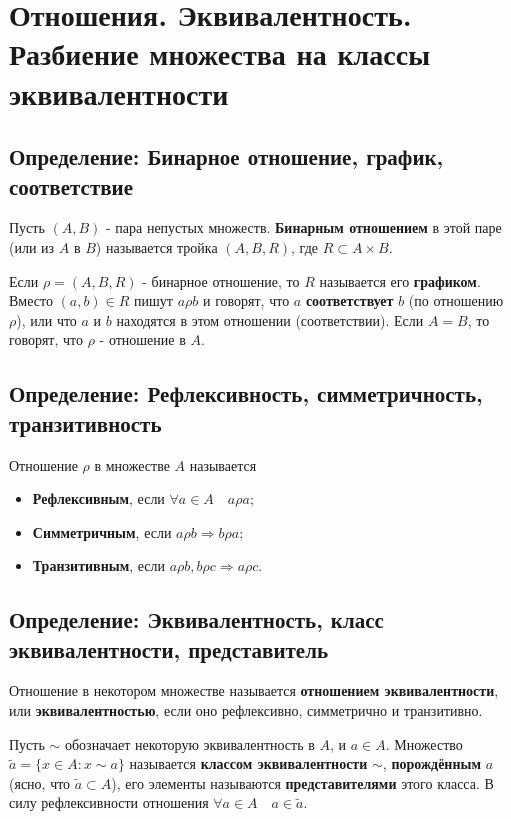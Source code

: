 \documentclass{article}
\begin{document}
\newpage
\section{Отношения. Эквивалентность. Разбиение множества на классы эквивалентности}

\subsection{Определение: Бинарное отношение, график, соответствие}
Пусть $(A, B)$ - пара непустых множеств. \textbf{Бинарным отношением} в этой паре (или из $A$ в $B$) называется тройка $(A, B, R)$, где $R \subset A \times B$.

Если $\rho = (A, B, R)$ - бинарное отношение, то $R$ называется его \textbf{графиком}. Вместо ${(a, b) \in R}$ пишут $a \rho b$ и говорят, что $a$ \textbf{соответствует} $b$ (по отношению $\rho$), или что $a$ и $b$ находятся в этом отношении (соответствии). Если $A = B$, то говорят, что $\rho$ - отношение в $A$.

\subsection{Определение: Рефлексивность, симметричность, транзитивность}
Отношение $\rho$ в множестве $A$ называется
\begin{itemize}
\item \textbf{Рефлексивным}, если $\forall a \in A \quad a \rho a$;
\item \textbf{Симметричным}, если $a \rho b \Rightarrow b \rho a$;
\item \textbf{Транзитивным}, если $a \rho b, b \rho c \Rightarrow a \rho c$.
\end{itemize}

\subsection{Определение: Эквивалентность, класс эквивалентности, представитель}
Отношение в некотором множестве называется \textbf{отношением эквивалентности}, или \textbf{эквивалентностью}, если оно рефлексивно, симметрично и транзитивно.

Пусть $\sim$ обозначает некоторую эквивалентность в $A$, и $a \in A$. Множество $\tilde{a} = \{x \in A : x \sim a\}$ называется \textbf{классом эквивалентности} $\sim$, \textbf{порождённым} $a$ (ясно, что $\tilde{a} \subset A$), его элементы называются \textbf{представителями} этого класса. В силу рефлексивности отношения $\forall a \in A \quad a \in \tilde{a}$.
\end{document}
